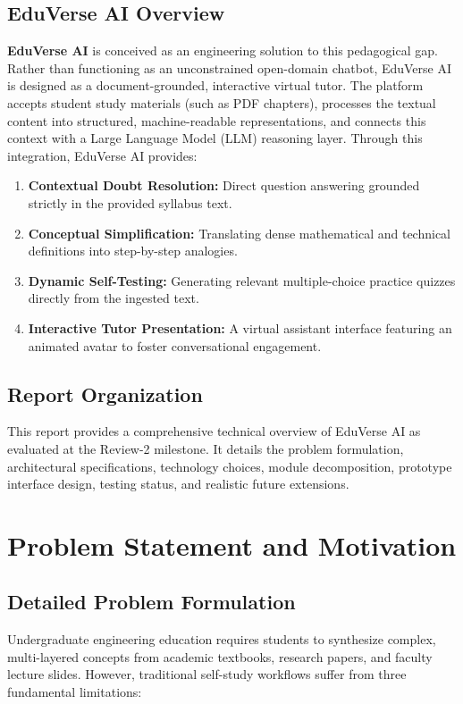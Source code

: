 \documentclass[11pt,a4paper]{report}
\begin{document}
\section{EduVerse AI Overview}
\textbf{EduVerse AI} is conceived as an engineering solution to this pedagogical gap. Rather than functioning as an unconstrained open-domain chatbot, EduVerse AI is designed as a document-grounded, interactive virtual tutor. The platform accepts student study materials (such as PDF chapters), processes the textual content into structured, machine-readable representations, and connects this context with a Large Language Model (LLM) reasoning layer. Through this integration, EduVerse AI provides:
\begin{enumerate}[noitemsep, topsep=2pt]
    \item \textbf{Contextual Doubt Resolution:} Direct question answering grounded strictly in the provided syllabus text.
    \item \textbf{Conceptual Simplification:} Translating dense mathematical and technical definitions into step-by-step analogies.
    \item \textbf{Dynamic Self-Testing:} Generating relevant multiple-choice practice quizzes directly from the ingested text.
    \item \textbf{Interactive Tutor Presentation:} A virtual assistant interface featuring an animated avatar to foster conversational engagement.
\end{enumerate}

\section{Report Organization}
This report provides a comprehensive technical overview of EduVerse AI as evaluated at the Review-2 milestone. It details the problem formulation, architectural specifications, technology choices, module decomposition, prototype interface design, testing status, and realistic future extensions.
\clearpage

\chapter{Problem Statement and Motivation}
\label{ch:problem}

\section{Detailed Problem Formulation}
Undergraduate engineering education requires students to synthesize complex, multi-layered concepts from academic textbooks, research papers, and faculty lecture slides. However, traditional self-study workflows suffer from three fundamental limitations:
\end{document}
